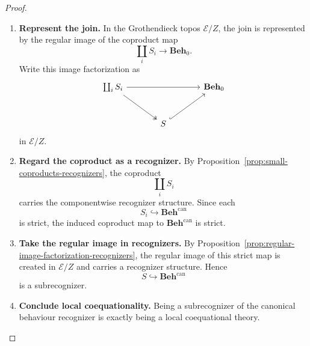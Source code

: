 \begin{proof}
    \leavevmode
    \begin{enumerate}
        \item \textbf{Represent the join.}
        In the Grothendieck topos \(\mathcal E/Z\), the join is represented by
        the regular image of the coproduct map
        \[
            \coprod_iS_i\to\mathbf{Beh}_0.
        \]
        Write this image factorization as
        \[
        \begin{tikzcd}[column sep=large, row sep=large]
            \coprod_iS_i
                \arrow[rr]
                \arrow[dr, two heads]
            &&
            \mathbf{Beh}_0
            \\
            &
            S
                \arrow[ur, hook]
            &
        \end{tikzcd}
        \]
        in \(\mathcal E/Z\).

        \item \textbf{Regard the coproduct as a recognizer.}
        By Proposition~\ref{prop:small-coproducts-recognizers}, the coproduct
        \[
            \coprod_iS_i
        \]
        carries the componentwise recognizer structure. Since each
        \[
            S_i\hookrightarrow\mathbf{Beh}^{\mathrm{can}}
        \]
        is strict, the induced coproduct map to
        \(\mathbf{Beh}^{\mathrm{can}}\) is strict.

        \item \textbf{Take the regular image in recognizers.}
        By Proposition~\ref{prop:regular-image-factorization-recognizers}, the
        regular image of this strict map is created in \(\mathcal E/Z\) and
        carries a recognizer structure. Hence
        \[
            S\hookrightarrow\mathbf{Beh}^{\mathrm{can}}
        \]
        is a subrecognizer.

        \item \textbf{Conclude local coequationality.}
        Being a subrecognizer of the canonical behaviour recognizer is exactly
        being a local coequational theory.
    \end{enumerate}
\end{proof}

